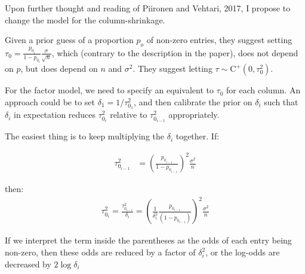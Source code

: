 \documentclass[11pt]{amsart}
\begin{document}
Upon further thought and reading of Piironen and Vehtari, 2017, I propose to change the model for the column-shrinkage.

Given a prior guess of a proportion $p_o$ of non-zero entries, they suggest setting $\tau_0 = \frac{p_{0_i}}{1-p_{0_i}}\frac{\sigma}{\sqrt{n}}$, which (contrary
to the description in the paper), does not depend on $p$, but does depend on $n$ and $\sigma^2$. They suggest letting $\tau \sim \mbox{C}^+(0,\tau^2_0)$.

For the factor model, we need to specify an equivalent to $\tau_0$ for each column. An approach could be to set $\delta_1 = 1/\tau^2_{0_1}$, and then calibrate 
the prior on $\delta_i$ such that $\delta_i$ in expectation reduces $\tau^2_{0_i}$ relative to $\tau^2_{0_{i-1}}$ appropriately.

The easiest thing is to keep multiplying the $\delta_i$ together.  If:


\begin{align*}
\tau^2_{0_{i-1}} &= \left(\frac{p_{0_{i-1}}}{1-p_{0_{i-1}}}\right)^2\frac{\sigma^2}{n} 
\end{align*}

\noindent then:
\begin{align*}
\tau^2_{0_{i}} = \frac{\tau^2_{0_{i-1}} }{\delta_i} = \left(\frac{1}{\delta^2_i}\frac{p_{0_{i-1}}}{(1-p_{0_{i-1}})}\right)^2\frac{\sigma^2}{n} 
\end{align*}

If we interpret the term inside the parentheses as the odds of each entry being non-zero, then these odds are reduced by a factor of $\delta^2_i$, or the log-odds are decreased by $2 \log\delta_i$
\end{document}
